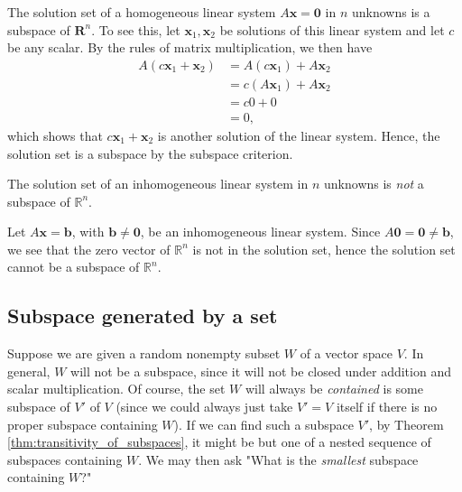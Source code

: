 \documentclass[12pt,letterpaper,reqno]{article}
\numberwithin{equation}{section}
\begin{document}
\begin{example}\label{ex:solution_sets_of_homogeneous_linear_systems}
The solution set of a homogeneous linear system $A\mathbf{x}=\mathbf{0}$ in $n$ unknowns is a subspace of $\mathbf{R}^n$. To see this, let $\mathbf{x}_1, \mathbf{x}_2$ be solutions of this linear system and let $c$ be any scalar. By the rules of matrix multiplication, we then have
\begin{align*}
	A(c\mathbf{x}_1+\mathbf{x}_2)&=A(c\mathbf{x}_1)+A\mathbf{x}_2 \\
	&=c(A\mathbf{x}_1)+A\mathbf{x}_2 \\
	&=c0+0 \\
	&=0,
\end{align*}
which shows that $c\mathbf{x}_1+\mathbf{x}_2$ is another solution of the linear system. Hence, the solution set is a subspace by the subspace criterion.
\end{example}

\begin{exercise}
The solution set of an inhomogeneous linear system in $n$ unknowns is \emph{not} a subspace of $\mathbb{R}^n$. 	
\end{exercise}

{\color{red}\begin{solution}
	Let $A\mathbf{x}=\mathbf{b}$, with $\mathbf{b} \neq \mathbf{0}$, be an inhomogeneous linear system. Since $A\mathbf{0}=\mathbf{0} \neq \mathbf{b}$, we see that the zero vector of $\mathbb{R}^n$ is not in the solution set, hence the solution set cannot be a subspace of $\mathbb{R}^n$. 
\end{solution}}


\subsection{Subspace generated by a set}\label{sec:subspace_generated_by_a_set}
Suppose we are given a random nonempty subset $W$ of a vector space $V$. In general, $W$ will not be a subspace, since it will not be closed under addition and scalar multiplication. Of course, the set $W$ will always be \emph{contained} is some subspace of $V'$ of $V$ (since we could always just take $V'=V$ itself if there is no proper subspace containing $W$). If we can find such a subspace $V'$, by Theorem \ref{thm:transitivity_of_subspaces}, it might be but one of a nested sequence of subspaces containing $W$. We may then ask "What is the \emph{smallest} subspace containing $W$?" 
\end{document}
